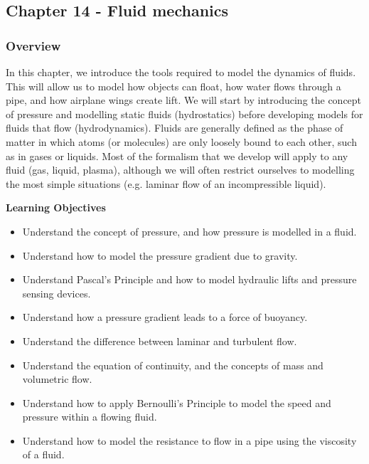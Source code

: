 \subsection{Chapter 14 - Fluid mechanics}

\subsubsection{Overview}\label{chapter:fluidmechanics}

In this chapter, we introduce the tools required to model the dynamics of fluids. This will allow us to model how objects can float, how water flows through a pipe, and how airplane wings create lift. We will start by introducing the concept of pressure and modelling static fluids (hydrostatics) before developing models for fluids that flow (hydrodynamics). Fluids are generally defined as the phase of matter in which atoms (or molecules) are only loosely bound to each other, such as in gases or liquids.  Most of the formalism that we develop will apply to any fluid (gas, liquid, plasma), although we will often restrict ourselves to modelling the most simple situations (e.g. laminar flow of an incompressible liquid).

\begin{framed}
\textbf{Learning Objectives}\\
\begin{itemize}
\item Understand the concept of pressure, and how pressure is modelled in a fluid.
\item Understand how to model the pressure gradient due to gravity.
\item Understand Pascal's Principle and how to model hydraulic lifts and pressure sensing devices.
\item Understand how a pressure gradient leads to a force of buoyancy.
\item Understand the difference between laminar and turbulent flow.
\item Understand the equation of continuity, and the concepts of mass and volumetric flow.
\item Understand how to apply Bernoulli's Principle to model the speed and pressure within a flowing fluid.
\item Understand how to model the resistance to flow in a pipe using the viscosity of a fluid.
\end{itemize}
\end{framed}


